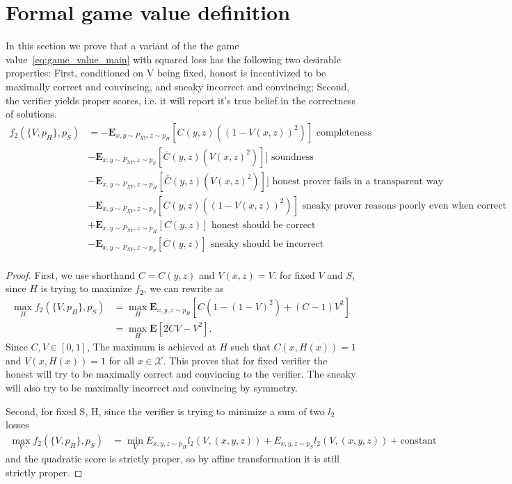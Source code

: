 \documentclass{article}
\begin{document}
\section{Formal game value definition}
\label{sec:formal_proof}
In this section we prove that a variant of the the game value~\eqref{eq:game_value_main} with squared loss has the following two desirable properties: First, conditioned on V being fixed, honest is incentivized to be maximally correct and convincing, and sneaky incorrect and convincing; Second, the verifier yields proper scores, i.e. it will report it's true belief in the correctness of solutions.
\begin{align*}
    f_2(\{V, p_H\}, p_S) &= 
   - \mathbf{E}_{x, y \sim P_{XY}, z \sim p_H}[C(y, z) ((1-V(x, z))^2)]\text{  completeness} \\
   &- \mathbf{E}_{x, y \sim P_{XY}, z \sim p_S}[\overline{C}(y, z)(V(x, z)^2)]]\text{  soundness} \\
   &- \mathbf{E}_{x, y \sim P_{XY}, z \sim p_H}[\overline{C}(y, z)(V(x, z)^2)]]\text{ honest prover fails in a transparent way} \\
   &- \mathbf{E}_{x, y \sim P_{XY}, z \sim p_S}[C(y, z)((1-V(x, z))^2)]\text{ sneaky prover reasons poorly even when correct} \\
   &+ \mathbf{E}_{x, y \sim P_{XY}, z \sim p_H}[C(y, z)] \text{ honest should be correct} \\
   &- \mathbf{E}_{x, y \sim P_{XY}, z \sim p_S}[\overline{C}(y, z)]\text{  sneaky should be incorrect}\\
   
   
\end{align*}
\begin{proof}
First, we use shorthand $C = C(y, z)$ and $V(x, z)=V$. for fixed $V$ and $S$, since $H$ is trying to maximize $f_2$, we can rewrite as
\begin{align*}
    \max_{H} f_2(\{V, p_H\}, p_S) &= \max_H \mathbf{E}_{x, y, z \sim p_H} \left[C(1-(1-V)^2) + (C-1) V^2\right] \\
    &= \max_H \mathbf{E} \left[2C V - V^2\right].
\end{align*} Since $C, V \in [0, 1]$, The maximum is achieved at $H$ such that $C(x, H(x)) = 1$ and $V(x, H(x))=1$ for all $x \in \mathcal{X}$. This proves that for fixed verifier the honest will try to be maximally correct and convincing to the verifier. The sneaky will also try to be maximally incorrect and convincing by symmetry.

Second, for fixed S, H, since the verifier is trying to minimize a sum of two $l_2$ losses
\begin{align*}
    \max_{V} f_2(\{V, p_H\}, p_S) &= \min_{V} E_{x, y, z \sim p_H}l_2(V, (x, y, z)) + E_{x, y, z \sim p_S}l_2(V, (x, y, z)) + \text{constant}
\end{align*} and the quadratic score is strictly proper, so by affine transformation it is still strictly proper.
\end{proof}
\fi
\end{document}
